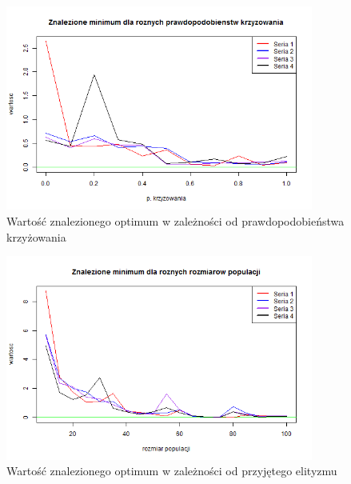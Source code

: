 \documentclass[11pt, a4paper]{article}
\begin{document}
\begin{figure}[H]
	\begin{center}
		\includegraphics[width=0.9\textwidth]{./assets/Gulf3.png} %
		\caption{Wartość znalezionego optimum w zależności od prawdopodobieństwa krzyżowania}
		\label{fig:gulf3}
	\end{center}
\end{figure}

\begin{figure}[H]
	\begin{center}
		\includegraphics[width=0.9\textwidth]{./assets/Gulf4.png} %
		\caption{Wartość znalezionego optimum w zależności od przyjętego elityzmu}
		\label{fig:gulf4}
	\end{center}
\end{figure}
\end{document}
